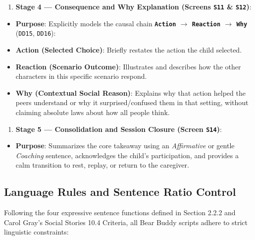 \begin{enumerate}
  \item \textbf{Stage 4 — Consequence and Why Explanation (Screens \texttt{S11} \& \texttt{S12})}:
\end{enumerate}
\begin{itemize}
  \item \textbf{Purpose}: Explicitly models the causal chain \textbf{\texttt{Action} $\rightarrow$ \texttt{Reaction} $\rightarrow$ \texttt{Why}} (\texttt{DD15}, \texttt{DD16}):
  \item \textbf{Action (Selected Choice)}: Briefly restates the action the child selected.
  \item \textbf{Reaction (Scenario Outcome)}: Illustrates and describes how the other characters in this specific scenario respond.
  \item \textbf{Why (Contextual Social Reason)}: Explains why that action helped the peers understand or why it surprised/confused them in that setting, without claiming absolute laws about how all people think.
\end{itemize}
\begin{enumerate}
  \item \textbf{Stage 5 — Consolidation and Session Closure (Screen \texttt{S14})}:
\end{enumerate}
\begin{itemize}
  \item \textbf{Purpose}: Summarizes the core takeaway using an \textit{Affirmative} or gentle \textit{Coaching} sentence, acknowledges the child's participation, and provides a calm transition to rest, replay, or return to the caregiver.
\end{itemize}



\subsection{Language Rules and Sentence Ratio Control}


Following the four expressive sentence functions defined in Section 2.2.2 and Carol Gray's Social Stories 10.4 Criteria, all Bear Buddy scripts adhere to strict linguistic constraints:

